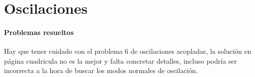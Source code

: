 \documentclass[/home/hernan-barquero/Documents/Apuntes_mecanica_teorica/main.tex]{subfiles}
\begin{document}
    \part{Oscilaciones}

    \subsection{Problemas resueltos}
    Hay que tener cuidado con el problema 6 de oscilaciones acopladas, la solución en página cuadricula no es la mejor y falta concretar detalles, incluso podría ser incorrecta a la hora de buscar los modos normales de oscilación.
    
    
\end{document}
